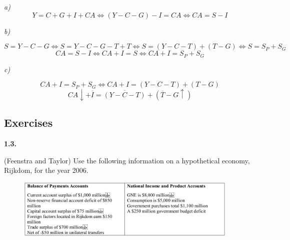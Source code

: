 \documentclass[11pt, a4paper]{article}
\begin{document}
\dotfill

\textit{a)}
$$Y = C + G + I + CA \Leftrightarrow  (Y - C - G) - I = CA \Leftrightarrow CA = S - I $$

\textit{b)}

$$ S = Y - C - G \Leftrightarrow  S = Y - C - G -T + T \Leftrightarrow S = (Y-C -T) + (T - G) \Leftrightarrow S = S_P + S_G  $$
$$ CA = S - I \Leftrightarrow  CA + I = S \Leftrightarrow CA + I= S_P + S_G $$

\textit{c)}

$$ CA + I= S_P + S_G \Leftrightarrow CA + I= (Y-C -T) + (T - G)$$
$$ CA \downarrow + \overline{I}= \overline{(Y-C -T)} + (\overline{T} - G \uparrow)$$

\clearpage

\subsection*{Exercises}

\textbf{1.3.}

(Feenstra and Taylor) Use the following information on a hypothetical economy, Rijkdom, for the year 2006.

\begin{figure}[!htb]
	\centering
	\includegraphics[width=0.95\textwidth]{img/ps01_0103.png}
	\label{}
\end{figure}
\end{document}
